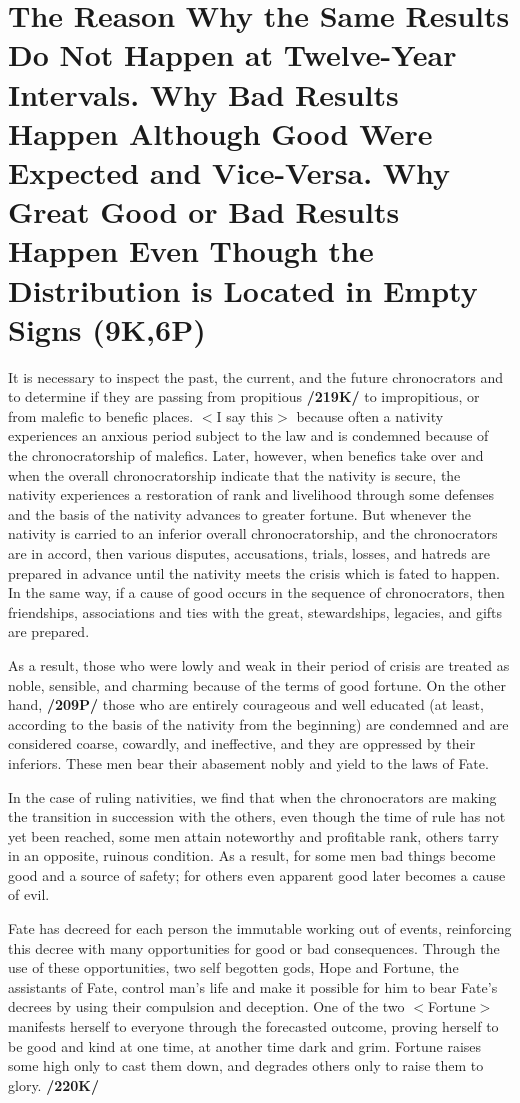 \section{The Reason Why the Same Results Do Not Happen at Twelve-Year Intervals. Why Bad Results Happen Although Good Were Expected and Vice-Versa. Why Great Good or Bad Results Happen Even Though the Distribution is Located in Empty Signs (9K,6P)}

It is necessary to inspect the past, the current, and the future chronocrators and to determine if they are passing from propitious \textbf{/219K/} to impropitious, or from malefic to benefic places. $<$I say this$>$ because often a nativity experiences an anxious period subject to the law and is condemned because of the
chronocratorship of malefics. Later, however, when benefics take over and when the overall chronocratorship indicate that the nativity is secure, the nativity experiences a restoration of rank and livelihood
through some defenses and the basis of the nativity advances to greater fortune. But whenever the nativity is carried to an inferior overall chronocratorship, and the chronocrators are in accord, then various disputes, accusations, trials, losses, and hatreds are prepared in advance until the nativity meets the crisis which is fated to happen. 
In the same way, if a cause of good occurs in the sequence of chronocrators, then friendships, associations and ties with the great, stewardships, legacies, and gifts are prepared.

As a result, those who were lowly and weak in their period of crisis are treated as noble, sensible, and charming because of the terms of good fortune. On the other hand, \textbf{/209P/} those who are entirely
courageous and well educated (at least, according to the basis of the nativity from the beginning) are condemned and are considered coarse, cowardly, and ineffective, and they are oppressed by their inferiors. These men bear their abasement nobly and yield to the laws of Fate. 

In the case of ruling nativities, we find that when the chronocrators are making the transition in succession with the others, even though the time of rule has not yet been reached, some men attain noteworthy and profitable rank, others tarry in an opposite, ruinous condition. As a result, for some men bad things become good and a source of safety; for others even apparent good later becomes a cause of evil.

Fate has decreed for each person the immutable working out of events, reinforcing this decree with many opportunities for good or bad consequences. Through the use of these opportunities, two self begotten gods, Hope and Fortune, the assistants of Fate, control man’s life and make it possible for him to bear Fate’s decrees by using their compulsion and deception. One of the two $<$Fortune$>$ manifests herself to everyone through the forecasted outcome, proving herself to be good and kind at one time, at another time dark and grim. Fortune raises some high only to cast them down, and degrades others only to raise them to glory. \textbf{/220K/} 

